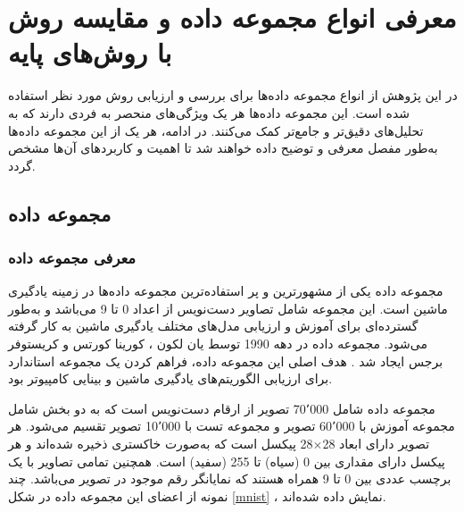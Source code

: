 \section{
	معرفی انواع مجموعه داده و مقایسه روش
	با روش‌های پایه
}
در این پژوهش از انواع مجموعه داده‌ها برای بررسی و ارزیابی روش مورد نظر استفاده شده است. این مجموعه داده‌ها هر یک ویژگی‌های منحصر به فردی دارند که به تحلیل‌های دقیق‌تر و جامع‌تر کمک می‌کنند. در ادامه، هر یک از این مجموعه داده‌ها به‌طور مفصل معرفی و توضیح داده خواهند شد تا اهمیت و کاربردهای آن‌ها مشخص گردد.


\subsection{
مجموعه داده
}

\vspace{3mm}
\subsubsection{
	معرفی مجموعه داده
}\vspace{-1mm}

مجموعه داده
یکی از مشهورترین و پر استفاده‌ترین مجموعه داده‌ها در زمینه یادگیری ماشین است. این مجموعه شامل تصاویر دست‌نویس از اعداد 0 تا 9 می‌باشد و به‌طور گسترده‌ای برای آموزش و ارزیابی مدل‌های مختلف یادگیری ماشین به کار گرفته می‌شود.
مجموعه داده
در دهه 1990 توسط یان لکون%
،
کورینا کورتس%
و کریستوفر برجس%
 ایجاد شد
 \cite{lecun1998gradient}.
 هدف اصلی این مجموعه داده، فراهم کردن یک مجموعه استاندارد برای ارزیابی الگوریتم‌های یادگیری ماشین و بینایی کامپیوتر بود.

مجموعه داده
شامل 70٬000 تصویر از ارقام دست‌نویس است که به دو بخش شامل مجموعه آموزش با 60٬000 تصویر و مجموعه تست با 10٬000 تصویر تقسیم می‌شود. هر تصویر دارای ابعاد
28$\times$28
پیکسل است که به‌صورت خاکستری%
ذخیره شده‌اند و هر پیکسل دارای مقداری بین 0 (سیاه) تا 255 (سفید) است. همچنین تمامی تصاویر با یک برچسب عددی بین 0 تا 9 همراه هستند که نمایانگر رقم موجود در تصویر می‌باشد.
چند نمونه از اعضای این مجموعه داده در شکل
\ref{mnist}%
، نمایش داده شده‌اند.

